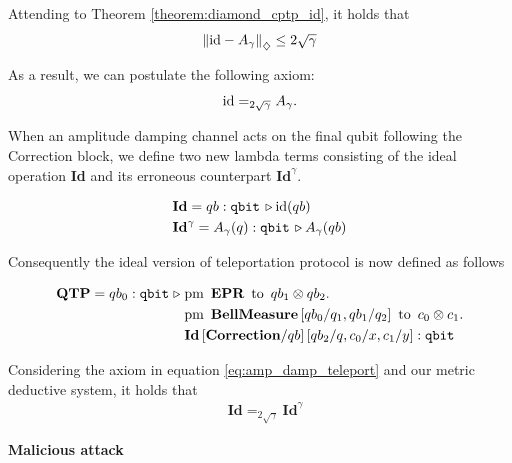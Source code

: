 \begin{example}
Attending to Theorem \ref{theorem:diamond_cptp_id}, it holds that
\begin{align*}
  \left\lVert  \mathrm{id} - A_\gamma \right\rVert_{\diamondsuit} \leq 2 \sqrt{\gamma}
\end{align*}

As a result, we can postulate the following axiom:
    \begin{align} \label{eq:amp_damp_teleport}
        \mathrm{id} =_{2 \sqrt{\gamma}} A_\gamma.
    \end{align}


When an amplitude damping channel acts on the final qubit following the Correction block, we define two new lambda terms consisting of the ideal operation \textbf{Id} and its erroneous counterpart  $\textbf{Id}^{\gamma}$.

\begin{align}\label{eq:id_error_teleport}
  &\textbf{Id} = qb:\mathtt{qbit} \, \triangleright \mathrm{id} (qb) \\
  & \textbf{Id}^{\gamma} = A_{\gamma} (q):\mathtt{qbit} \, \triangleright  A_{\gamma} (qb)
\end{align}


Consequently the ideal version of teleportation protocol is now defined as follows

\begin{align*} 
  \textbf{QTP} = qb_{0}: \mathtt{qbit}\hspace{3 pt} \triangleright \hspace{3 pt} & \text{pm} \hspace{5pt} \textbf{EPR} \hspace{5pt} \text{to} \hspace{5pt}  qb_{1} \otimes qb_{2}.  \notag \\
     & \text{pm}\hspace{5pt} \textbf{BellMeasure}\, [qb_0/q_1,qb_{1}/q_2] \hspace{5pt}  \text{to} \hspace{5pt} c_{0}\otimes c_{1} . \notag \\
     & \textbf{Id} \, [ \textbf{Correction}/qb] \, [qb_{2}/q,c_{0}/x, c_{1}/y] 
     : \mathtt{qbit}  
 \end{align*}

 Considering the axiom in equation \eqref{eq:amp_damp_teleport} and our metric deductive system, it holds that 
\begin{align*}
  &\textbf{Id}=_{2 \sqrt{\gamma}} \textbf{Id}^{\gamma}
\end{align*}

\textbf{Malicious attack}


\end{example}
